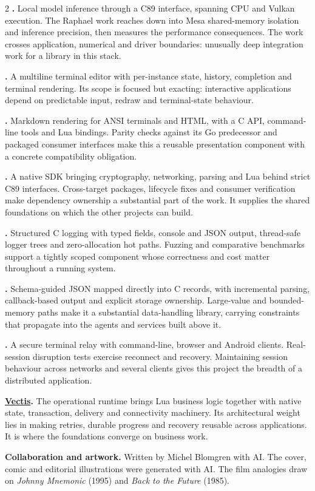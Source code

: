 \begin{multicols}{2}
\medskip
\noindent\textbf{.}
Local model inference through a C89 interface, spanning CPU and Vulkan execution. The Raphael work reaches down into Mesa shared-memory isolation and inference precision, then measures the performance consequences. The work crosses application, numerical and driver boundaries: unusually deep integration work for a library in this stack.

\medskip
\noindent\textbf{.}
A multiline terminal editor with per-instance state, history, completion and terminal rendering. Its scope is focused but exacting: interactive applications depend on predictable input, redraw and terminal-state behaviour.

\medskip
\noindent\textbf{.}
Markdown rendering for ANSI terminals and HTML, with a C API, command-line tools and Lua bindings. Parity checks against its Go predecessor and packaged consumer interfaces make this a reusable presentation component with a concrete compatibility obligation.

\medskip
\noindent\textbf{.}
A native SDK bringing cryptography, networking, parsing and Lua behind strict C89 interfaces. Cross-target packages, lifecycle fixes and consumer verification make dependency ownership a substantial part of the work. It supplies the shared foundations on which the other projects can build.

\medskip
\noindent\textbf{.}
Structured C logging with typed fields, console and JSON output, thread-safe logger trees and zero-allocation hot paths. Fuzzing and comparative benchmarks support a tightly scoped component whose correctness and cost matter throughout a running system.

\medskip
\noindent\textbf{.}
Schema-guided JSON mapped directly into C records, with incremental parsing, callback-based output and explicit storage ownership. Large-value and bounded-memory paths make it a substantial data-handling library, carrying constraints that propagate into the agents and services built above it.

\medskip
\noindent\textbf{.}
A secure terminal relay with command-line, browser and Android clients. Real-session disruption tests exercise reconnect and recovery. Maintaining session behaviour across networks and several clients gives this project the breadth of a distributed application.

\medskip
\noindent\textbf{\href{https://c89.systems/vectis/}{Vectis}.}
The operational runtime brings Lua business logic together with native state, transaction, delivery and connectivity machinery. Its architectural weight lies in making retries, durable progress and recovery reusable across applications. It is where the foundations converge on business work.

\medskip
\noindent\textbf{Collaboration and artwork.}
Written by Michel Blomgren with AI. The cover, comic and editorial illustrations were generated with AI. The film analogies draw on \emph{Johnny Mnemonic} (1995) and \emph{Back to the Future} (1985).
\end{multicols}
\endgroup
